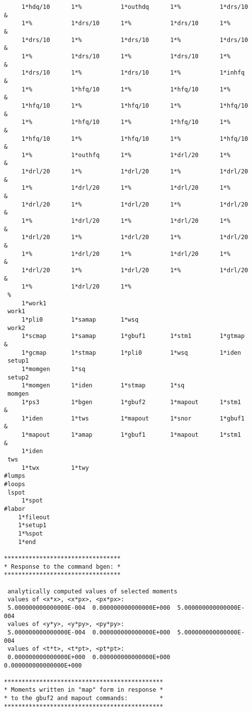 \begin{footnotesize}
\begin{verbatim}
     1*hdq/10      1*%           1*outhdq      1*%           1*drs/10   &
     1*%           1*drs/10      1*%           1*drs/10      1*%        &
     1*drs/10      1*%           1*drs/10      1*%           1*drs/10   &
     1*%           1*drs/10      1*%           1*drs/10      1*%        &
     1*drs/10      1*%           1*drs/10      1*%           1*inhfq    &
     1*%           1*hfq/10      1*%           1*hfq/10      1*%        &
     1*hfq/10      1*%           1*hfq/10      1*%           1*hfq/10   &
     1*%           1*hfq/10      1*%           1*hfq/10      1*%        &
     1*hfq/10      1*%           1*hfq/10      1*%           1*hfq/10   &
     1*%           1*outhfq      1*%           1*drl/20      1*%        &
     1*drl/20      1*%           1*drl/20      1*%           1*drl/20   &
     1*%           1*drl/20      1*%           1*drl/20      1*%        &
     1*drl/20      1*%           1*drl/20      1*%           1*drl/20   &
     1*%           1*drl/20      1*%           1*drl/20      1*%        &
     1*drl/20      1*%           1*drl/20      1*%           1*drl/20   &
     1*%           1*drl/20      1*%           1*drl/20      1*%        &
     1*drl/20      1*%           1*drl/20      1*%           1*drl/20   &
     1*%           1*drl/20      1*%
 %
     1*work1
 work1
     1*pli0        1*samap       1*wsq
 work2
     1*scmap       1*samap       1*gbuf1       1*stm1        1*gtmap    &
     1*gcmap       1*stmap       1*pli0        1*wsq         1*iden
 setup1
     1*momgen      1*sq
 setup2
     1*momgen      1*iden        1*stmap       1*sq
 momgen
     1*ps3         1*bgen        1*gbuf2       1*mapout      1*stm1     &
     1*iden        1*tws         1*mapout      1*snor        1*gbuf1    &
     1*mapout      1*amap        1*gbuf1       1*mapout      1*stm1     &
     1*iden
 tws
     1*twx         1*twy
#lumps
#loops
 lspot
     1*spot
#labor
    1*fileout
    1*setup1
    1*%spot
    1*end

*********************************
* Response to the command bgen: *
*********************************

 analytically computed values of selected moments
 values of <x*x>, <x*px>, <px*px>:
 5.000000000000000E-004  0.000000000000000E+000  5.000000000000000E-004
 values of <y*y>, <y*py>, <py*py>:
 5.000000000000000E-004  0.000000000000000E+000  5.000000000000000E-004
 values of <t*t>, <t*pt>, <pt*pt>:
 0.000000000000000E+000  0.000000000000000E+000  0.000000000000000E+000

*********************************************
* Moments written in "map" form in response *
* to the gbuf2 and mapout commands:         *
*********************************************


\end{verbatim}
\end{footnotesize}

